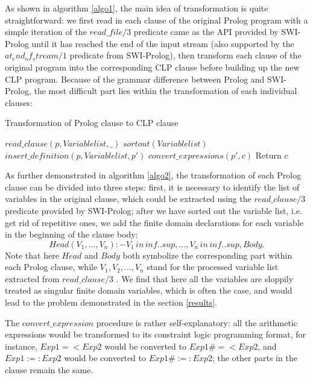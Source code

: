 \documentclass[12pt]{article}
\begin{document}
As shown in algorithm \ref{algo1}, the main idea of transformation is quite straightforward: we first read in each clause of the original Prolog program with a simple iteration of the $read\_file/3$ predicate came as the API provided by SWI-Prolog until it has reached the end of the input stream (also supported by the $at_end_of_stream/1$ predicate from SWI-Prolog), then transform each clause of the original program into the corresponding CLP clause before building up the new CLP program. Because of the grammar difference between Prolog and SWI-Prolog, the most difficult part lies within the transformation of each individual clauses:

\begin{algorithm}
\caption{Transformation of Prolog clause to CLP clause}
\label{algo2}
\begin{algorithmic}[1]
    \State $read\_clause(p, Variablelist, \_)$
    \State $sortout(Variablelist)$
    \State $insert\_definition(p, Variablelist, p')$
    \State $convert\_expressions(p', c)$
	\State Return $c$
\EndProcedure
\end{algorithmic}
\end{algorithm}

As further demonstrated in algorithm \ref{algo2}, the transformation of each Prolog clause can be divided into three steps: first, it is necessary to identify the list of variables in the original clause, which could be extracted using the $read\_clause/3$ predicate provided by SWI-Prolog; after we have sorted out the variable list, i.e. get rid of repetitive ones, we add the finite domain declarations for each variable in the beginning of the clause body:
\begin{equation}\label{eq1}
  Head(V_1, ..., V_n) :- V_1\,in\,inf..sup, ..., V_n\,in\,inf..sup, Body.
\end{equation}
Note that here $Head$ and $Body$ both symbolize the corresponding part within each Prolog clause, while $V_1, V_2, ... ,V_n$ stand for the processed variable list extracted from $read\_clause/3$	. We find that here all the variables are sloppily treated as singular finite domain variables, which is often the case, and would lead to the problem demonstrated in the section \ref{results}.

The $convert\_expression$ procedure is rather self-explanatory: all the arithmetic expressions would be transformed to its constraint logic programming format, for instance, $Exp1=<Exp2$ would be converted to $Exp1\#=<Exp2$, and $Exp1:=:Exp2$ would be converted to $Exp1\#:=:Exp2$; the other parts in the clause remain the same. 
\end{document}
